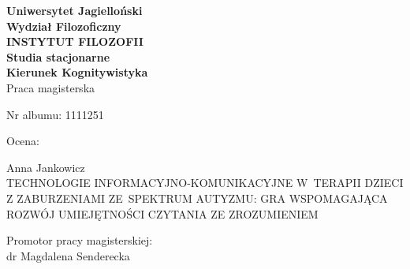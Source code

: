 \documentclass[a4paper,12pt]{report}
\title{\titlepl}
\author{\authorname}
\date{2019}
\newcommand{\authorname}{Anna Jankowicz}
\newcommand{\supname}{dr Magdalena Senderecka}
\begin{document}

\thispagestyle{empty}

{\centering\linespread{1.05}
    \textbf{
    {\Large Uniwersytet Jagielloński\\}
    {\large Wydział Filozoficzny\\
      \uppercase{Instytut Filozofii}\\}
      \textbf{Studia stacjonarne\\
      Kierunek Kognitywistyka}\\
    }
    \vspace{0.5cm}    
    {\large{Praca magisterska\\}}
}

\vspace{1cm}
\begin{minipage}[t]{0.4\textwidth}
    \begin{flushleft} \large Nr albumu: 1111251\\ \end{flushleft}
\end{minipage}
\begin{minipage}[t]{0.4\textwidth}
    \begin{flushright} \large Ocena:\\ \end{flushright}
\end{minipage}

\vspace{0.3cm}
{\centering\LARGE{\authorname\\}}
\vspace{0.5cm}
{\centering\linespread{1.15}\LARGE{TECHNOLOGIE INFORMACYJNO-KOMUNIKACYJNE W~TERAPII DZIECI Z ZABURZENIAMI ZE~SPEKTRUM AUTYZMU: GRA WSPOMAGAJĄCA ROZWÓJ UMIEJĘTNOŚCI CZYTANIA ZE ZROZUMIENIEM\\}}

\vspace{2.5cm}
\begin{minipage}[t]{0.4\textwidth}
    \begin{flushleft} \large
    \end{flushleft}
\end{minipage}
\begin{minipage}[t]{0.5\textwidth}
    \begin{flushright} \large
    Promotor pracy magisterskiej:\\ \supname
    \end{flushright}
\end{minipage}
\vspace{2cm}
\end{document}
